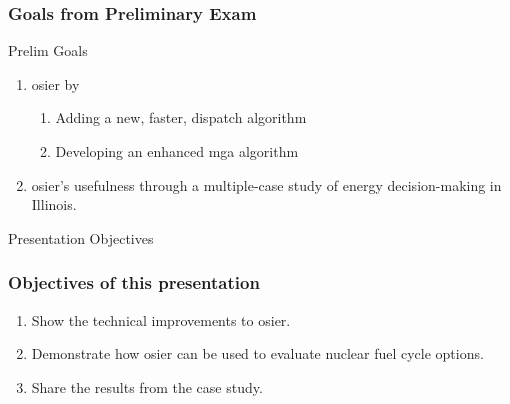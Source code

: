 \begin{frame}
    \frametitle{Goals from Preliminary Exam}

    \begin{block}{Prelim Goals}
        \begin{enumerate}[<+->]
            \item {} \gls{osier} by
            \begin{enumerate}
                \item Adding a new, faster, dispatch algorithm
                \item Developing an enhanced \gls{mga} algorithm
            \end{enumerate}
            \item {} \gls{osier}'s usefulness through a 
            multiple-case study of energy decision-making in Illinois.
        \end{enumerate}
    \end{block}
    \pause
    \begin{block}{Presentation Objectives}
        \frametitle{Objectives of this presentation}
        \begin{enumerate}[<+->]
            \item Show the technical improvements to \gls{osier}.
            \item Demonstrate how \gls{osier} can be used to evaluate nuclear fuel cycle options.
            \item Share the results from the case study.
        \end{enumerate}
    \end{block}
\end{frame}